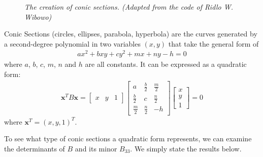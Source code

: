 \begin{figure}[ht!]
\caption{\textit{The creation of conic sections. (Adapted from the code of Ridlo W. Wibowo)}}
\label{fig:conicsecs}
\end{figure}
\begin{defn}
\label{defn:conic}
Conic Sections (circles, ellipses, parabola, hyperbola) are the curves generated by a second-degree polynomial in two variables $(x, y)$ that take the general form of
\begin{align}
ax^2 + bxy + cy^2 + mx + ny - h = 0
\end{align}
where $a$, $b$, $c$, $m$, $n$ and $h$ are all constants. It can be expressed as a quadratic form:
\begin{align}
\textbf{x}^T B\textbf{x} = 
\begin{bmatrix}
x & y & 1
\end{bmatrix}
\begin{bmatrix}
a & \frac{b}{2} & \frac{m}{2} \\
\frac{b}{2} & c & \frac{n}{2} \\
\frac{m}{2} & \frac{n}{2} & -h
\end{bmatrix}
\begin{bmatrix}
x \\
y \\
1
\end{bmatrix} = 0
\end{align}
where $\textbf{x}^T = (x,y,1)^T$.
\end{defn}
To see what type of conic sections a quadratic form represents, we can examine the determinants of $B$ and its minor $B_{33}$. We simply state the results below.
